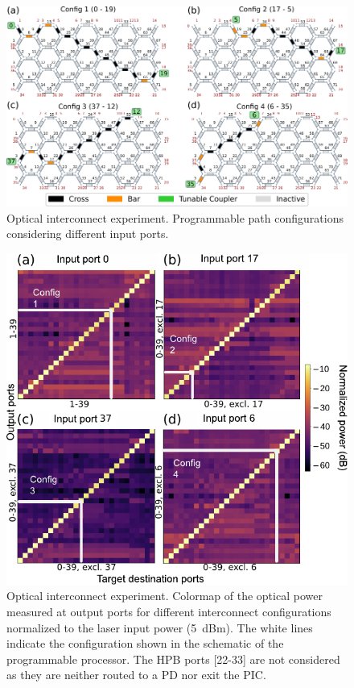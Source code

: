 \begin{figure}[h!]
	\begin{center}
		\includegraphics{figures/ch3-interconnects.pdf}
	\end{center}
	\caption{Optical interconnect experiment.
		Programmable path configurations considering different input ports.
	}\label{fig:ch3-interconnects}
\end{figure}

\begin{figure}[t]
	\begin{center}
		\includegraphics{figures/ch3-inter_power_meter.pdf}
	\end{center}
	\caption{Optical interconnect experiment.
		Colormap of the optical power measured at output ports for different interconnect configurations normalized to the laser input power (5~dBm).
		The white lines indicate the configuration shown in the schematic of the programmable processor.
		The HPB ports [22-33] are not considered as they are neither routed to a PD nor exit the PIC.
	}\label{fig:ch3-inter_power_meter}
\end{figure}

